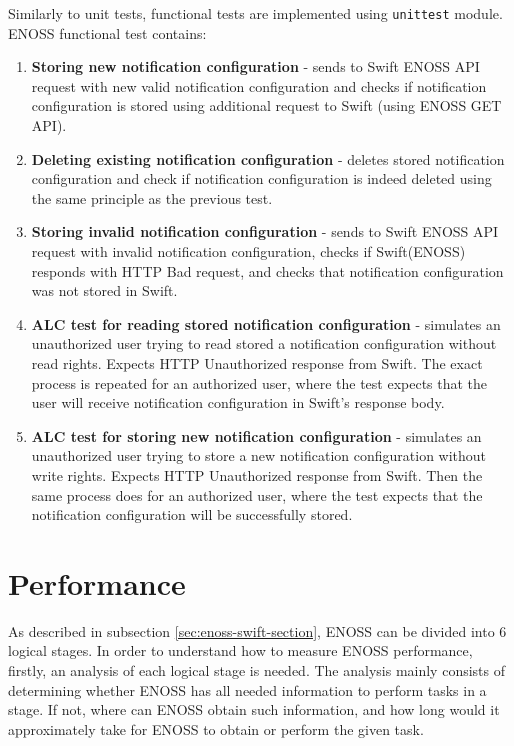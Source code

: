     Similarly to unit tests, functional tests are implemented using \texttt{unittest} module. ENOSS functional test contains:
    \begin{enumerate}
        \item \textbf{Storing new notification configuration} - sends to Swift ENOSS API request with new valid notification configuration and checks if notification configuration is stored using additional request to Swift (using ENOSS GET API).
        \item \textbf{Deleting existing notification configuration} - deletes stored notification configuration and check if notification configuration is indeed deleted using the same principle as the previous test.
        \item \textbf{Storing invalid notification configuration} - sends to Swift ENOSS API request with invalid notification configuration, checks if Swift(ENOSS) responds with HTTP Bad request, and checks that notification configuration was not stored in Swift.
        \item \textbf{ALC test for reading stored notification configuration} - simulates an unauthorized user trying to read stored a notification configuration without read rights. Expects HTTP Unauthorized response from Swift. The exact process is repeated for an authorized user, where the test expects that the user will receive notification configuration in Swift's response body.
        \item \textbf{ALC test for storing new notification configuration} - simulates an unauthorized user trying to store a new notification configuration without write rights. Expects HTTP Unauthorized response from Swift. Then the same process does for an authorized user, where the test expects that the notification configuration will be successfully stored.
    \end{enumerate}
\section{Performance}
    As described in subsection \ref{sec:enoss-swift-section}, ENOSS can be divided into 6 logical stages. In order to understand how to measure ENOSS performance, firstly, an analysis of each logical stage is needed. The analysis mainly consists of determining whether ENOSS has all needed information to perform tasks in a stage. If not, where can ENOSS obtain such information, and how long would it approximately take for ENOSS to obtain or perform the given task.

